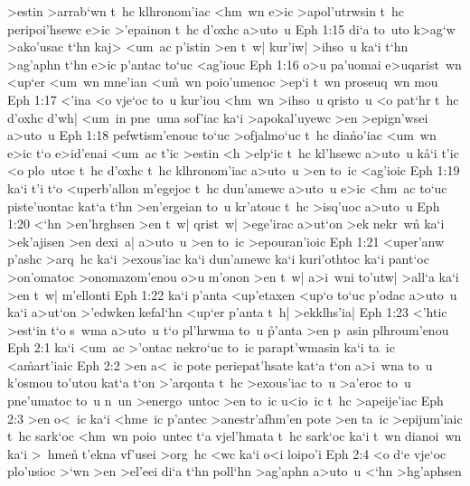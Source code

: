 >estin
>arrab`wn
t~hc
klhronom'iac
<hm~wn
e>ic
>apol'utrwsin
t~hc
peripoi'hsewc
e>ic
>'epainon
t~hc
d'oxhc
a>uto~u\bibvsend
\vs Eph 1:15
di`a
to~uto
k>ag`w
>ako'usac
t`hn
kaj>
<um~ac
p'istin
>en
t~w|
kur'iw|
>ihso~u
ka`i
t`hn
>ag'aphn
t`hn
e>ic
p'antac
to`uc
<ag'iouc\bibvsend
\vs Eph 1:16
o>u
pa'uomai
e>uqarist~wn
<up`er
<um~wn
mne'ian
<u\r{m}~wn
poio'umenoc
>ep`i
t~wn
proseuq~wn
mou\bibvsend
\vs Eph 1:17
<'ina
<o
vje`oc
to~u
kur'iou
<hm~wn
>ihso~u
qristo~u
<o
pat`hr
t~hc
d'oxhc
d'wh|
<um~in
pne~uma
sof'iac
ka`i
>apokal'uyewc
>en
>epign'wsei
a>uto~u\bibvsend
\vs Eph 1:18
pefwtism'enouc
to`uc
>ofjalmo`uc
t~hc
dia\r{n}o'iac
<um~wn
e>ic
t`o
e>id'enai
<um~ac
t'ic
>estin
<h
>elp`ic
t~hc
kl'hsewc
a>uto~u
k\r{a}`i
t'ic
<o
plo~utoc
t~hc
d'oxhc
t~hc
klhronom'iac
a>uto~u
>en
to~ic
<ag'ioic\bibvsend
\vs Eph 1:19
ka`i
t'i
t`o
<uperb'allon
m'egejoc
t~hc
dun'amewc
a>uto~u
e>ic
<hm~ac
to`uc
piste'uontac
kat`a
t`hn
>en'ergeian
to~u
kr'atouc
t~hc
>isq'uoc
a>uto~u\bibvsend
\vs Eph 1:20
<`hn
>en'hrghsen
>en
t~w|
qrist~w|
>ege'irac
a>ut`on
>ek
nekr~wn\r{}
ka`i
>ek'ajisen
>en
dexi~a|
a>uto~u
>en
to~ic
>epouran'ioic\bibvsend
\vs Eph 1:21
<uper'anw
p'ashc
>arq~hc
ka`i
>exous'iac
ka`i
dun'amewc
ka`i
kuri'othtoc
ka`i
pant`oc
>on'omatoc
>onomazom'enou
o>u
m'onon
>en
t~w|
a>i~wni
to'utw|
>all`a
ka`i
>en
t~w|
m'ellonti\bibvsend
\vs Eph 1:22
ka`i
p'anta
<up'etaxen
<up`o
to`uc
p'odac
a>uto~u
ka`i
a>ut`on
>'edwken
kefal`hn
<up`er
p'anta
t~h|
>ekklhs'ia|\bibvsend
\vs Eph 1:23
<'htic
>est`in
t`o
s~wma
a>uto~u
t`o
pl'hrwma
to~u
\r{p}'anta
>en
p~asin
plhroum'enou\bibvsend
\vs Eph 2:1
ka`i
<um~ac
>'ontac
nekro`uc
to~ic
parapt'wmasin
ka`i
ta~ic
<a\-\r{m}ar\-t'i\-aic\bibvsend
{}
\vs Eph 2:2
>en
a<~ic
pote
periepat'hsate
kat`a
t`on
a>i~wna
to~u
k'osmou
to'utou
kat`a
t`on
>'arqonta
t~hc
>exous'iac
to~u
>a'eroc
to~u
pne'umatoc
to~u
n~un
>energo~untoc
>en
to~ic
u<io~ic
t~hc
>apeije'iac\bibvsend
\vs Eph 2:3
>en
o<~ic
ka`i
<hme~ic
p'antec
>anestr'afhm'en
pote
>en
ta~ic
>epijum'iaic
t~hc
sark`oc
<hm~wn
poio~untec
t`a
vjel'hmata
t~hc
sark`oc
ka`i
t~wn
dianoi~wn
ka`i
>~hme\r{n}
t'ekna
vf'usei
>org~hc
<wc
ka`i
o<i
loipo'i\bibvsend
\vs Eph 2:4
<o
d`e
vje`oc
plo'usioc
>`wn
>en
>el'eei
di`a
t`hn
poll`hn
>ag'aphn
a>uto~u
<`hn
>hg'aphsen
